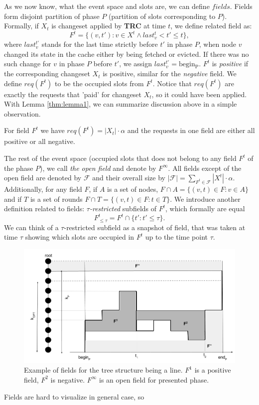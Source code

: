 As we now know, what the event space and slots are, we can define $fields$.
Fields form disjoint partition of phase $P$ (partition of slots corresponding to
$P$). Formally, if $X_t$ is changeset applied by \textbf{TRC} at time $t$, we
define related field as: $$F^t = \{(v, t'): v \in X^t \wedge last_v^t < t' \leq
t\},$$ where $last_v^{t'}$ stands for the last time strictly before $t'$ in
phase $P$, when node $v$ changed its state in the cache either by being fetched
or evicted. If there was no such change for $v$ in phase $P$ before $t'$, we
assign $last_v^{t'} = \mathrm{begin_P}$. $F^t$ is \textit{positive} if the
corresponding changeset $X_t$ is positive, similar for the \textit{negative}
field. We define $req(F^t)$ to be the occupied slots from $F^t$. Notice that
$req(F^t)$ are exactly the requests that 'paid' for changeset $X_t$, so it could
have been applied. With Lemma \ref{thm:lemma1}, we can summarize discussion
above in a simple observation.  \begin{observe} For field $F^t$ we have
$req(F^t) = |X_t| \cdot \alpha$ and the requests in one field are either all
positive or all negative.  \label{obs:observe1} \end{observe} The rest of the
event space (occupied slots that does not belong to any field $F^t$ of the phase
$P$), we call \textit{the open field} and denote by $F^{\infty}$. All fields
except of the open field are denoted by $\mathcal{F}$ and their overall size by
$|\mathcal{F}| = \sum_{F^t \in \mathcal{F}} |X^t| \cdot \alpha$.  Additionally,
for any field $F$, if $A$ is a set of nodes, $F \cap A = \{(v,t) \in F: v \in
A\}$ and if $T$ is a set of rounds $F \cap T = \{(v, t) \in F: t \in T\}$. We
introduce another definition related to fields: $\tau$\textit{-restricted}
subfields of $F^t$, which formally are equal $$F^t_{\leq \tau} = F^t \cap \{t':
t' \leq \tau\}.$$ We can think of a $\tau$-restricted subfield as a snapshot of
field, that was taken at time $\tau$ showing which slots are occupied in $F^t$
up to the time point $\tau$.  \begin{figure} \begin{center}
\includegraphics[width=1.1\textwidth]{fields.png} \end{center} \caption{Example
of fields for the tree structure being a line. $F^1$ is a positive field, $F^2$
is negative. $F^{\infty}$ is an open field for presented phase.}
\label{fig:fields} \end{figure} Fields are hard to visualize in general case, so

